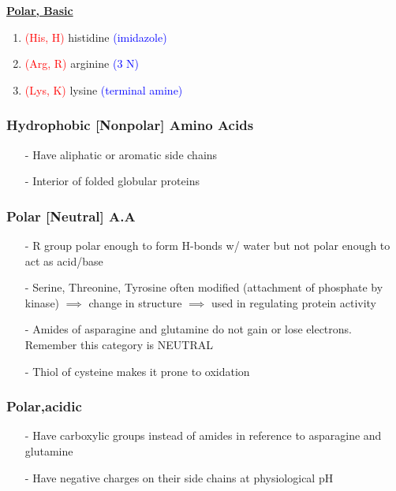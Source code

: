 \documentclass[../Bio_chemistryReview.tex]{subfiles}
\begin{document}
\hspace{5em}
\noindent\parbox[t]{3in}{\raggedright%
  \textbf{\underline{Polar, Basic}}
  \begin{enumerate} [topsep=2pt,itemsep=-2pt,leftmargin=13pt]
    \item \textcolor{red}{(His, H)} histidine \textcolor{blue}{(imidazole)}
    \item \textcolor{red}{(Arg, R)} arginine \textcolor{blue}{(3 N)}
    \item \textcolor{red}{(Lys, K)} lysine \textcolor{blue}{(terminal amine)}
  \end{enumerate}
}
\newpage
\subsubsection{Hydrophobic [Nonpolar] Amino Acids}
\begin{enumerate} [topsep=2pt,itemsep=-2pt,leftmargin=13pt]
  \item[-] Have aliphatic or aromatic side chains
  \item[-] Interior of folded globular proteins
\end{enumerate}

\subsubsection{Polar [Neutral] A.A}
\begin{enumerate} [topsep=2pt,itemsep=-2pt,leftmargin=13pt]
  \item[-] R group polar enough to form H-bonds w/ water but not polar enough to
    act as acid/base 
  \item[-] Serine, Threonine, Tyrosine often modified (attachment of phosphate by
    kinase) $\implies$ change in structure
    $\implies$ used in regulating protein activity
  \item[-] Amides of asparagine and glutamine do not gain or lose electrons.
    Remember this category is NEUTRAL
  \item[-] Thiol of cysteine makes it prone
    to oxidation
\end{enumerate}

\subsubsection{Polar,acidic}
\begin{enumerate} [topsep=2pt,itemsep=-2pt,leftmargin=13pt]
  \item[-] Have carboxylic groups instead of amides in reference to asparagine
    and glutamine 
  \item [-] Have negative charges on their side chains at
    physiological pH
\end{enumerate}
\end{document}
